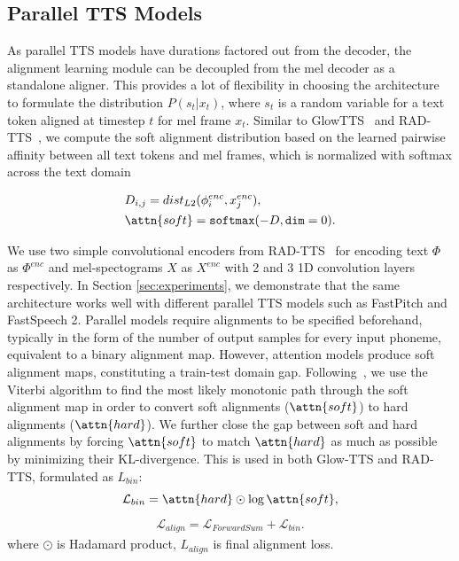 
\subsection{Parallel TTS Models}
\label{sec:non_autoregressive_alignment_framework}
As parallel TTS models have durations factored out from the decoder, the alignment learning module can be decoupled from the mel decoder as a standalone aligner. This provides a lot of flexibility in choosing the architecture to formulate the distribution $ P(s_t | x_t)$, where $s_t$ is a random variable for a text token aligned at timestep $t$ for mel frame $x_t$. Similar to GlowTTS~\cite{kim2020glowtts} and RAD-TTS~\cite{rad_tts}, we compute the soft alignment distribution based on the learned pairwise affinity between all text tokens and mel frames, which is normalized with softmax across the text domain

\begin{align}
    &D_{i,j} = dist_{L2}(\phi_i^{enc}, x_j^{enc}),\\
    &\attn{soft} = \texttt{softmax}(-D, \texttt{dim}=0).
\end{align}

We use two simple convolutional encoders from RAD-TTS~\cite{rad_tts} for encoding text $\Phi$ as $\Phi^{enc}$ and mel-spectograms $X$ as $X^{enc}$ with 2 and 3 1D convolution layers respectively. In Section \ref{sec:experiments}, we demonstrate that the same architecture works well with different parallel TTS models such as FastPitch and FastSpeech 2. Parallel models require alignments to be specified beforehand, typically in the form of the number of output samples for every input phoneme, equivalent to a binary alignment map. However, attention models produce soft alignment maps, constituting a train-test domain gap. Following~\cite{rad_tts,kim2020glowtts}, we use the Viterbi algorithm to find the most likely monotonic path through the soft alignment map in order to convert soft alignments ($\attn{soft}$) to hard alignments ($\attn{hard}$). We further close the gap between soft and hard alignments by forcing $\attn{soft}$ to match $\attn{hard}$ as much as possible by minimizing their KL-divergence. This is used in both Glow-TTS and RAD-TTS, formulated as ${L}_{bin}$:
\begin{equation}
    \mathcal{L}_{bin} = \attn{hard} \odot \log\attn{soft},
\end{equation}
\begin{equation}
  \begin{aligned}
     \mathcal{L}_{\mathit{align}} = \mathcal{L}_{\mathit{ForwardSum}} + \mathcal{L}_{bin}.
   \end{aligned}
\end{equation}
where $\odot$ is Hadamard product, ${L}_{\mathit{align}}$ is final alignment loss.


